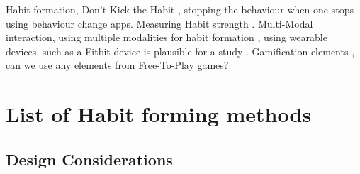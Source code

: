 Habit formation, Don't Kick the Habit \cite{article_dont_kick_habit}, stopping the behaviour when one stops using behaviour change apps.\newline
Measuring Habit strength \cite{article_habit_strength} \cite{article_habit_measurement}.\newline
\newline
Multi-Modal interaction, using multiple modalities for habit formation \cite{}, using wearable devices, such as a Fitbit device is plausible for a study \cite{article_wearable_good}.\newline
\newline
Gamification elements \cite{f2p_games_how_to}, can we use any elements from Free-To-Play games?\newline
\newline



\newpage
\section{List of Habit forming methods}

\subsection{Design Considerations}

